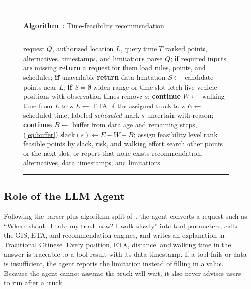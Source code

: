\begin{figure}[htbp]
\noindent\rule{\columnwidth}{0.6pt}\\[-2pt]
\label{alg:gg}%
\textbf{Algorithm~\thealgcount:} Time-feasibility recommendation\\[-6pt]
\noindent\rule{\columnwidth}{0.4pt}
\small
\begin{algorithmic}[1]
\REQUIRE request $Q$, authorized location $L$, query time $T$
\ENSURE ranked points, alternatives, timestamps, and limitations
\STATE parse $Q$; \textbf{if} required inputs are missing \textbf{return} a request for them
\STATE load rules, points, and schedules; \textbf{if} unavailable \textbf{return} data limitation
\STATE $S \leftarrow$ candidate points near $L$; \textbf{if} $S=\emptyset$ widen range or time slot
\STATE fetch live vehicle positions with observation times
    \STATE remove $s$; \textbf{continue}
  \ENDIF
  \STATE $W \leftarrow$ walking time from $L$ to $s$
  \STATE $E \leftarrow$ ETA of the assigned truck to $s$
    \STATE $E \leftarrow$ scheduled time, labeled \emph{scheduled}
  \ENDIF
    \STATE mark $s$ uncertain with reason; \textbf{continue}
  \ENDIF
  \STATE $B \leftarrow$ buffer from data age and remaining stops, (\ref{eq:buffer})
  \STATE $\mathrm{slack}(s) \leftarrow E - W - B$; assign feasibility level
\ENDFOR
\STATE rank feasible points by slack, risk, and walking effort
  \STATE search other points or the next slot, or report that none exists
\ENDIF
\RETURN recommendation, alternatives, data timestamps, and limitations
\end{algorithmic}
\vspace{-4pt}
\noindent\rule{\columnwidth}{0.4pt}
\end{figure}

\subsection{Role of the LLM Agent}
Following the parser-plus-algorithm split of~\cite{yuan2025llmap}, the
agent converts a request such as ``Where should I take my trash now? I
walk slowly'' into tool parameters, calls the GIS, ETA, and
recommendation engines, and writes an explanation in Traditional Chinese.
Every position, ETA, distance, and walking time in the answer is traceable
to a tool result with its data timestamp. If a tool fails or data is
insufficient, the agent reports the limitation instead of filling in a
value. Because the agent cannot assume the truck will wait, it also never
advises users to run after a truck.
